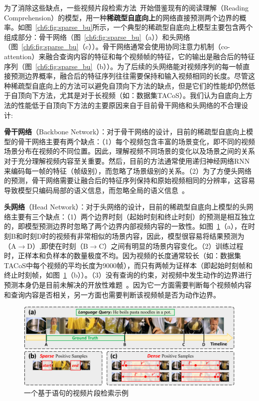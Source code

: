 为了消除这些缺点，一些视频片段检索方法~\cite{chen2019localizing,yuan2019find,feng2018video}开始借鉴现有的阅读理解（Reading Comprehension）的模型\cite{xiong2017dynamic,xiong2018dcn+,yu2018qanet}，用一种\textbf{稀疏型自底向上}的网络直接预测两个边界的概率。如图~\ref{ch6:fig:sparse_bu}所示，一个典型的稀疏型自底向上模型主要包含两个组成部分：骨干网络（图~\ref{ch6:fig:sparse_bu}（a））和头网络（图~\ref{ch6:fig:sparse_bu}（c））。骨干网络通常会使用协同注意力机制（co-attention）来融合查询内容的特征和每个视频帧的特征，它的输出是融合后的特征序列（图~\ref{ch6:fig:sparse_bu}（b））。为了后续的头网络能对视频序列的每一帧直接预测边界概率，融合后的特征序列往往需要保持和输入视频相同的长度。尽管这种稀疏型自底向上的方法可以避免自顶向下方法的缺点，但是它们的性能却仍然低于自顶向下方法，尤其是对于长视频（如：数据集TACoS）。我们认为自底向上方法的性能低于自顶向下方法的主要原因来自于目前骨干网络和头网络的不合理设计:

\textbf{骨干网络}（Backbone Network）：对于骨干网络的设计，目前的稀疏型自底向上模型的骨干网络主要有两个缺点：（1）每个视频包含丰富的场景变化，即不同的视频场景分布在视频的不同位置。因此，理解视频不同场景的变化以及场景之间的关系对于充分理解视频内容至关重要。然后，目前的方法通常使用递归神经网络RNN来编码每一帧的特征（帧级别），而忽略了场景级别的关系。（2）为了方便头网络的预测，骨干网络需要让融合后的特征序列保持和原始视频相同的分辨率，这容易导致模型只编码局部的语义信息，而忽略全局的语义信息~\cite{chen2018encoder,lin2017feature}。

\textbf{头网络}（Head Network）：对于头网络的设计，目前的稀疏型自底向上模型的头网络主要有三个缺点：（1）两个边界时刻（起始时刻和终止时刻）的预测是相互独立的，即模型预测边界时忽略了两个边界内部视频内容的一致性。如图~\ref{ch6:fig:headnetwork_motivation}（a），在时刻B和时刻D时的视频有非常相似的场景内容，因此，模型很容易将结果预测为（A$\to$D）,即使在时刻（B$\to$C）之间有明显的场景内容变化。（2）训练过程时，正样本和负样本的数量极度不均。因为视频的长度通常较长（如：数据集TACoS中每个视频的平均长度为9000帧），而只有两帧为证样本（即起始时刻帧和终止时刻帧，如图~\ref{ch6:fig:headnetwork_motivation}（b））。（3）没有查询的约束，对视频中发生动作的边界进行预测本身仍是目前未解决的开放性难题~\cite{shou2018online}。因为它一方面需要判断每个视频帧内容和查询内容是否相关，另一方面也需要判断该视频帧是否为动作边界。

\begin{figure}[tbp]
    \centering
    \includegraphics[width=0.95\linewidth]{chapter6/res/headnetwork_motivation.pdf}
    \caption{一个基于语句的视频片段检索示例}
    \label{ch6:fig:headnetwork_motivation}
\end{figure}


